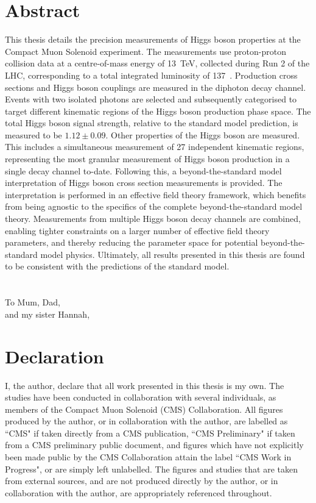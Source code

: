 \chapter*{\centering Abstract}
This thesis details the precision measurements of Higgs boson properties at the Compact Muon Solenoid experiment. The measurements use proton-proton collision data at a centre-of-mass energy of 13~TeV, collected during Run 2 of the LHC, corresponding to a total integrated luminosity of 137~\fbinv. Production cross sections and Higgs boson couplings are measured in the diphoton decay channel. Events with two isolated photons are selected and subsequently categorised to target different kinematic regions of the Higgs boson production phase space. The total Higgs boson signal strength, relative to the standard model prediction, is measured to be $1.12 \pm 0.09$. Other properties of the Higgs boson are measured. This includes a simultaneous measurement of 27 independent kinematic regions, representing the most granular measurement of Higgs boson production in a single decay channel to-date.
Following this, a beyond-the-standard model interpretation of Higgs boson cross section measurements is provided. The interpretation is performed in an effective field theory framework, which benefits from being agnostic to the specifics of the complete beyond-the-standard model theory. Measurements from multiple Higgs boson decay channels are combined, enabling tighter constraints on a larger number of effective field theory parameters, and thereby reducing the parameter space for potential beyond-the-standard model physics. Ultimately, all results presented in this thesis are found to be consistent with the predictions of the standard model.

\chapter*{\centering }%
\begin{center}
    \thispagestyle{empty}
    To Mum, Dad,\\ and my sister Hannah,
\end{center}


\chapter*{\centering Declaration}
I, the author, declare that all work presented in this thesis is my own. The studies have been conducted in collaboration with several individuals, as members of the Compact Muon Solenoid (CMS) Collaboration. All figures produced by the author, or in collaboration with the author, are labelled as ``CMS" if taken directly from a CMS publication, ``CMS Preliminary" if taken from a CMS preliminary public document, and figures which have not explicitly been made public by the CMS Collaboration attain the label ``CMS Work in Progress", or are simply left unlabelled. The figures and studies that are taken from external sources, and are not produced directly by the author, or in collaboration with the author, are appropriately referenced throughout.

